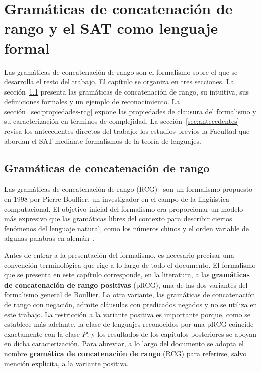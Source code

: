 \documentclass{report}
\theoremstyle{definition}
\theoremstyle{plain}
\theoremstyle{remark}
\begin{document}
\setcounter{chapter}{1}
\chapter{Gramáticas de concatenación de rango y el SAT como lenguaje formal}
\label{cap:rcg-sat}

Las gramáticas de concatenación de rango son el formalismo 
sobre el que se desarrolla el resto del trabajo.  El capítulo se organiza en tres secciones. La sección~\ref{sec:rcg}
presenta las gramáticas de concatenación de rango, su 
intuitiva, sus definiciones formales y un ejemplo  de
reconocimiento. La sección~\ref{sec:propiedades-rcg} expone las
propiedades de clausura del formalismo y su caracterización en
términos de complejidad. La sección~\ref{sec:antecedentes} revisa los
antecedentes directos del trabajo: los estudios previos   la Facultad 
que abordan el SAT mediante formalismos de la teoría de lenguajes.

\section{Gramáticas de concatenación de rango}
\label{sec:rcg}

Las gramáticas de concatenación de rango (RCG)~\cite{boullier1998proposal}
son un formalismo propuesto en 1998 por Pierre Boullier, un investigador
en el campo de la lingüística computacional. El objetivo inicial del
formalismo era proporcionar un modelo más expresivo que las gramáticas
libres del contexto para describir ciertos fenómenos del lenguaje
natural, como los números chinos y el orden variable de algunas palabras
en alemán~\cite{boullier1999chinese}.

Antes de entrar a la presentación del formalismo, es necesario precisar
una convención terminológica que rige a lo largo de todo el documento.
El formalismo que se presenta en este capítulo corresponde, en la
literatura, a las \textbf{gramáticas de concatenación de rango
  positivas} (pRCG), una de las dos variantes del formalismo general de
Boullier. La otra variante, las gramáticas de concatenación de rango con
negación, admite cláusulas con predicados negados y no se utiliza en
este trabajo. La restricción a la variante positiva es importante
porque, como se establece más adelante, la clase de lenguajes
reconocidos por una pRCG coincide exactamente con la clase $P$, y
los resultados de los capítulos posteriores se apoyan en dicha
caracterización. Para abreviar, a lo largo del documento se adopta el
nombre \textbf{gramática de concatenación de rango} (RCG) para
referirse, salvo mención explícita, a la variante positiva.
\end{document}
